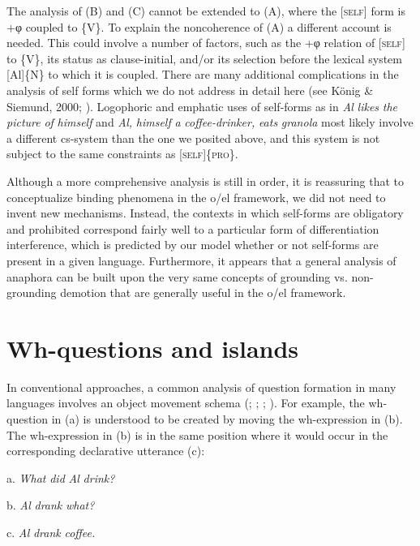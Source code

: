   The analysis of (B) and (C) cannot be extended to (A), where the [\textsc{self}] form is +φ coupled to \{V\}. To explain the noncoherence of (A) a different account is needed. This could involve a number of factors, such as the +φ relation of [\textsc{self}] to \{V\}, its status as clause-initial, and/or its selection before the lexical system [Al]\{N\} to which it is coupled. There are many additional complications in the analysis of self forms which we do not address in detail here (see König \& Siemund, 2000; \citealt{Safir2004}). Logophoric and emphatic uses of self-forms as in \textit{Al} \textit{likes} \textit{the} \textit{picture} \textit{of} \textit{himself} and \textit{Al,} \textit{himself} \textit{a} \textit{coffee-drinker,} \textit{eats} \textit{granola} most likely involve a different cs-system than the one we posited above, and this system is not subject to the same constraints as [\textsc{self}]\{\textsc{pro}\}. 

  Although a more comprehensive analysis is still in order, it is reassuring that to conceptualize binding phenomena in the o/el framework, we did not need to invent new mechanisms. Instead, the contexts in which self-forms are obligatory and prohibited correspond fairly well to a particular form of differentiation interference, which is predicted by our model whether or not self-forms are present in a given language. Furthermore, it appears that a general analysis of anaphora can be built upon the very same concepts of grounding vs. non-grounding demotion that are generally useful in the o/el framework.

\section{Wh-questions and islands}

In conventional approaches, a common analysis of question formation in many languages involves an object movement schema (\citealt{Baker1970}; \citealt{Cheng1997}; \citealt{Chomsky1965}; \citealt{Karttunen1977}). For example, the wh-question in (a) is understood to be created by moving the wh-expression in (b). The wh-expression in (b) is in the same position where it would occur in the corresponding declarative utterance (c):

  a.  \textit{What} \textit{did} \textit{Al} \textit{drink?}

  b.  \textit{Al} \textit{drank} \textit{what?}

  c.  \textit{Al} \textit{drank} \textit{coffee.}

